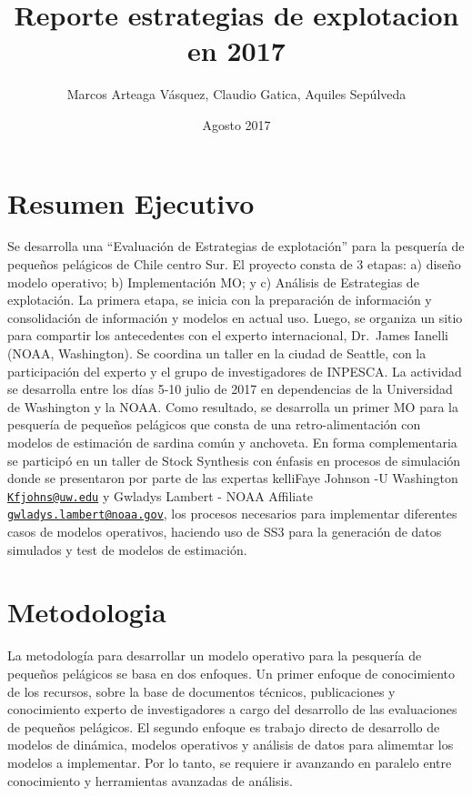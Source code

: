 \documentclass[]{article}
\title{Reporte estrategias de explotacion en 2017}
\author{Marcos Arteaga Vásquez, Claudio Gatica, Aquiles Sepúlveda}
\date{Agosto 2017}
\begin{document}
\maketitle

\section{Resumen Ejecutivo}\label{resumen-ejecutivo}

Se desarrolla una ``Evaluación de Estrategias de explotación'' para la
pesquería de pequeños pelágicos de Chile centro Sur. El proyecto consta
de 3 etapas: a) diseño modelo operativo; b) Implementación MO; y c)
Análisis de Estrategias de explotación. La primera etapa, se inicia con
la preparación de información y consolidación de información y modelos
en actual uso. Luego, se organiza un sitio para compartir los
antecedentes con el experto internacional, Dr.~James Ianelli (NOAA,
Washington). Se coordina un taller en la ciudad de Seattle, con la
participación del experto y el grupo de investigadores de INPESCA. La
actividad se desarrolla entre los días 5-10 julio de 2017 en
dependencias de la Universidad de Washington y la NOAA. Como resultado,
se desarrolla un primer MO para la pesquería de pequeños pelágicos que
consta de una retro-alimentación con modelos de estimación de sardina
común y anchoveta. En forma complementaria se participó en un taller de
Stock Synthesis con énfasis en procesos de simulación donde se
presentaron por parte de las expertas kelliFaye Johnson -U Washington
\href{mailto:Kfjohns@uw.edu}{\nolinkurl{Kfjohns@uw.edu}} y Gwladys
Lambert - NOAA Affiliate
\href{mailto:gwladys.lambert@noaa.gov}{\nolinkurl{gwladys.lambert@noaa.gov}},
los procesos necesarios para implementar diferentes casos de modelos
operativos, haciendo uso de SS3 para la generación de datos simulados y
test de modelos de estimación.

\section{Metodologia}\label{metodologia}

La metodología para desarrollar un modelo operativo para la pesquería de
pequeños pelágicos se basa en dos enfoques. Un primer enfoque de
conocimiento de los recursos, sobre la base de documentos técnicos,
publicaciones y conocimiento experto de investigadores a cargo del
desarrollo de las evaluaciones de pequeños pelágicos. El segundo enfoque
es trabajo directo de desarrollo de modelos de dinámica, modelos
operativos y análisis de datos para alimemtar los modelos a implementar.
Por lo tanto, se requiere ir avanzando en paralelo entre conocimiento y
herramientas avanzadas de análisis.
\end{document}
